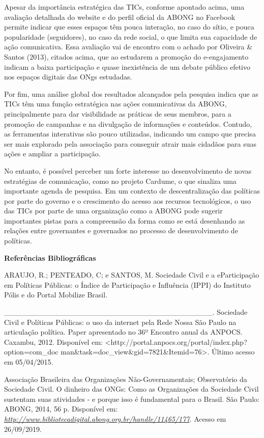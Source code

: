 Apesar da importância estratégica das TICs, conforme apontado acima, uma
avaliação detalhada do website e do perfil oficial da ABONG no Facebook
permite indicar que esses espaços têm pouca interação, no caso do sítio,
e pouca popularidade (seguidores), no caso da rede social, o que limita
sua capacidade de ação comunicativa. Essa avaliação vai de encontro com
o achado por Oliveira \& Santos (2013), citados acima, que ao estudarem
a promoção do e-engajamento indicam a baixa participação e quase
inexistência de um debate público efetivo nos espaços digitais das ONgs
estudadas.

Por fim, uma análise global dos resultados alcançados pela pesquisa
indica que as TICs têm uma função estratégica nas ações comunicativas da
ABONG, principalmente para dar visibilidade as práticas de seus membros,
para a promoção de campanhas e na divulgação de informações e conteúdos.
Contudo, as ferramentas interativas são pouco utilizadas, indicando um
campo que precisa ser mais explorado pela associação para conseguir
atrair mais cidadãos para suas ações e ampliar a participação.

No entanto, é possível perceber um forte interesse no desenvolvimento de
novas estratégias de comunicação, como no projeto Cardume, o que
sinaliza uma importante agenda de pesquisa. Em um contexto de
descentralização das políticas por parte do governo e o crescimento do
acesso aos recursos tecnológicos, o uso das TICs por parte de uma
organização como a ABONG pode sugerir importantes pistas para a
compreensão da forma como se está desenhando as relações entre
governantes e governados no processo de desenvolvimento de políticas.

\textbf{Referências Bibliográficas}

ARAUJO, R.; PENTEADO, C; e SANTOS, M. Sociedade Civil e a eParticipação
em Políticas Públicas: o Índice de Participação e Influência (IPPI) do
Instituto Pólis e do Portal Mobilize Brasil.

\_\_\_\_\_\_\_\_\_\_\_\_\_\_\_\_\_\_\_\_\_\_\_\_\_\_\_\_\_\_\_\_\_\_\_\_\_\_\_.
Sociedade Civil e Políticas Públicas: o uso da internet pela Rede Nossa
São Paulo na articulação política. Paper apresentado no 36º Encontro
anual da ANPOCS. Caxambu, 2012. Disponível em:
\textless{}http://portal.anpocs.org/portal/index.php?option=com\_doc
man\&task=doc\_view\&gid=7821\&Itemid=76\textgreater{}. Último acesso em
05/04/2015.

Associação Brasileira das Organizações Não-Governamentais; Observatório
da Sociedade Civil. O dinheiro das ONGs: Como as Organizações da
Sociedade Civil sustentam suas atividades - e porque isso é fundamental
para o Brasil. São Paulo: ABONG, 2014, 56 p. Disponível em:
\href{http://www.bibliotecadigital.abong.org.br/handle/11465/177}{\emph{http://www.bibliotecadigital.abong.org.br/handle/11465/177}}.
Acesso em 26/09/2019.

